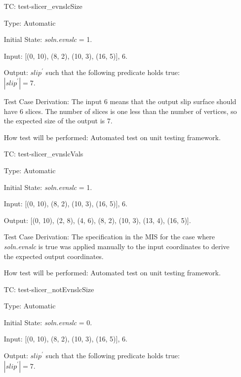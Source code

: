 \documentclass[12pt, titlepage]{article}
\newcounter{utestnum} %
\begin{document}
\begin{enumerate}[label=TC\arabic*:,ref={\arabic*}]
	
	\item [TC\refstepcounter{utestnum}\theutestnum: 
	\label{TC_SlicerEvnslcSize}] 
	test-slicer\_evnslcSize
	
	Type: Automatic
	
	Initial State: \textit{soln.evnslc} = 1.
	
	Input: [(0, 10), (8, 2), (10, 3), (16, 5)], 6.
	
	Output: $\textit{slip}^\prime$ such that the following predicate holds 
	true:\\ 
	$|\textit{slip}^\prime| = 7$.
	
	Test Case Derivation: The input 6 means that the output slip surface should 
	have 6 slices. The number of slices is one less than the number of 
	vertices, so the expected size of the output is 7.
	
	How test will be performed: Automated test on unit testing framework.
	
	\item [TC\refstepcounter{utestnum}\theutestnum: 
	\label{TC_SlicerEvnslcVals}] 
	test-slicer\_evnslcVals
	
	Type: Automatic
	
	Initial State: \textit{soln.evnslc} = 1.
	
	Input: [(0, 10), (8, 2), (10, 3), (16, 5)], 6.
	
	Output: [(0, 10), (2, 8), (4, 6), (8, 2), (10, 3), (13, 4), (16, 5)].
	
	Test Case Derivation: The specification in the MIS for the case where 
	\textit{soln.evnslc} is true was applied manually to the input coordinates 
	to derive the expected output coordinates.
	
	How test will be performed: Automated test on unit testing framework.
	
		\item [TC\refstepcounter{utestnum}\theutestnum: 
	\label{TC_SlicerNotEvnslcSize}] 
	test-slicer\_notEvnslcSize
	
	Type: Automatic
	
	Initial State: \textit{soln.evnslc} = 0.
	
	Input: [(0, 10), (8, 2), (10, 3), (16, 5)], 6.
	
	Output: $\textit{slip}^\prime$ such that the following predicate holds 
	true:\\ 
	$|\textit{slip}^\prime| = 7$.
	

\end{enumerate}
\end{document}

